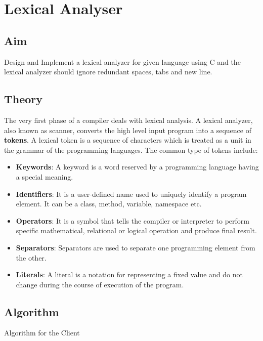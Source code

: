 \section{Lexical Analyser}

\subsection{Aim}
Design and Implement a lexical analyzer for given language using C and the lexical analyzer should ignore redundant spaces, tabs and new line.

\subsection{Theory}
    The very first phase of a compiler deals with lexical analysis. A lexical analyzer, also known as scanner, converts the high level input program into a sequence of \textbf{tokens}.  A lexical token is a sequence of characters which is treated as a unit in the grammar of the programming languages.    The common type of tokens include:   \\
    \begin{itemize}
        \item \textbf{Keywords}: A keyword is a word reserved by a programming language having a special meaning. 
        \item \textbf{Identifiers}: It is a user-defined name used to uniquely identify a program element. It can be a  class, method, variable, namespace etc.
        \item \textbf{Operators}: It is a symbol that tells the compiler or interpreter to perform specific mathematical, relational or logical operation and produce final result. 
        \item \textbf{Separators}: Separators are used to separate one programming element from the other.
        \item \textbf{Literals}: A literal is a notation for representing a fixed value and do not change during the course of execution of the program.
    \end{itemize}


\subsection{Algorithm}
    \begin{algorithm}[H]
    
    \caption{Algorithm for the Client}
    \end{algorithm}
    
